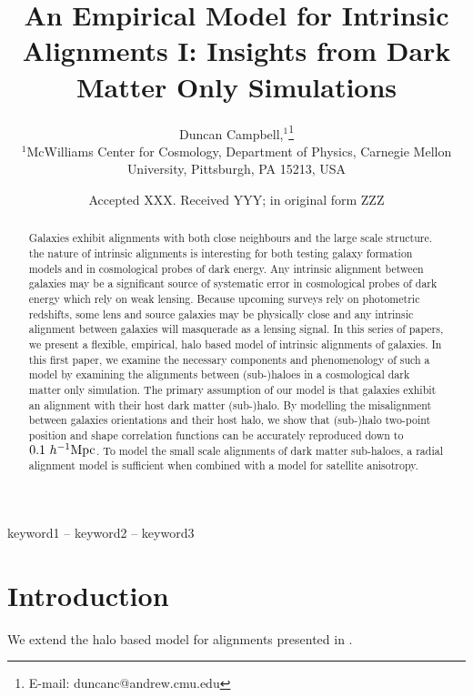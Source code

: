 \documentclass[fleqn,usenatbib]{mnras}
\title[An Empirical Model for Intrinsic Alignments I]{An Empirical Model for Intrinsic Alignments I: Insights from Dark Matter Only Simulations}
\author[D. Campbell et al.]{
Duncan Campbell,$^{1}$\thanks{E-mail: duncanc@andrew.cmu.edu}
\\
$^{1}$McWilliams Center for Cosmology, Department of Physics, Carnegie Mellon University, Pittsburgh, PA 15213, USA
\\
}
\date{Accepted XXX. Received YYY; in original form ZZZ}
\begin{document}
\label{firstpage}
\pagerange{\pageref{firstpage}--\pageref{lastpage}}
\maketitle

\begin{abstract}
Galaxies exhibit alignments with both close neighbours and the large scale structure.  the nature of intrinsic alignments is interesting for both testing galaxy formation models and in cosmological probes of dark energy.  Any intrinsic alignment between galaxies may be a significant source of systematic error in cosmological probes of dark energy which rely on weak lensing.  Because upcoming surveys rely on photometric redshifts, some lens and source galaxies may be physically close and any intrinsic alignment between galaxies will masquerade as a lensing signal.  In this series of papers, we present a flexible, empirical, halo based model of intrinsic alignments of galaxies.  In this first paper, we examine the necessary components and phenomenology of such a model by examining the alignments between (sub-)haloes in a cosmological dark matter only simulation.  The primary assumption of our model is that galaxies exhibit an alignment with their host dark matter (sub-)halo.  By modelling the misalignment between galaxies orientations and their host halo, we show that (sub-)halo two-point position and shape correlation functions can be accurately reproduced down to $0.1~h^{-1}{\rm Mpc}$.  To model the small scale alignments of dark matter sub-haloes, a radial alignment model is sufficient when combined with a model for satellite anisotropy.             
\end{abstract}

\begin{keywords}
keyword1 -- keyword2 -- keyword3
\end{keywords}



\section{Introduction}

We extend the halo based model for alignments presented in \citet{Schneider:2010cg}.
\end{document}
